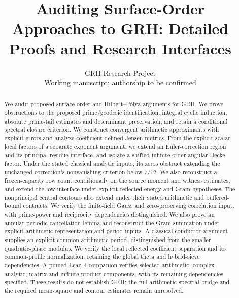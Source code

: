 
\title{Auditing Surface-Order Approaches to GRH: Detailed Proofs and Research Interfaces}
\author{GRH Research Project\\\small Working manuscript; authorship to be confirmed}
\maketitle\begin{center}\status\end{center}
\begin{abstract}
We audit proposed surface-order and Hilbert--P\'olya arguments for GRH.
We prove obstructions to the proposed prime/geodesic identification,
integral cyclic induction, absolute prime-tail estimates and determinant
preservation, and retain a conditional spectral closure criterion.
We construct convergent arithmetic approximants with explicit errors and
analyze coefficient-defined Jensen metrics. From the explicit scalar
local factors of a separate exponent argument, we extend an Euler-correction
region and its principal-residue interface, and isolate a shifted infinite-order angular Hecke factor.
Under the stated classical analytic inputs, its zeros obstruct extending
the unchanged correction's nonvanishing criterion below $7/12$.
We also reconstruct a frozen-capacity row count conditionally on the
source moment and witness estimates, and extend the low interface under
explicit reflected-energy and Gram hypotheses. The nonprincipal central
contours also extend under their stated arithmetic and buffered-bound
contracts. We verify the finite-field Gauss and zero-preserving correlation
input, with prime-power and reciprocity dependencies distinguished.
We also prove an annular periodic cancellation lemma and reconstruct the
Gram summation under explicit arithmetic representation and period inputs.
A classical conductor argument supplies an explicit common arithmetic period,
distinguished from the smaller quadratic-phase modulus.
We verify the local reflected coefficient separation and its common-profile
normalization, retaining the global theta and hybrid-sieve dependencies.
A pinned Lean 4 companion verifies
selected arithmetic, complex-analytic,
matrix and infinite-product components, with its remaining dependencies
specified. These results do not establish GRH; the full arithmetic
spectral bridge and the required mean-square and contour estimates
remain unresolved.
\end{abstract}
\tableofcontents\newpage



